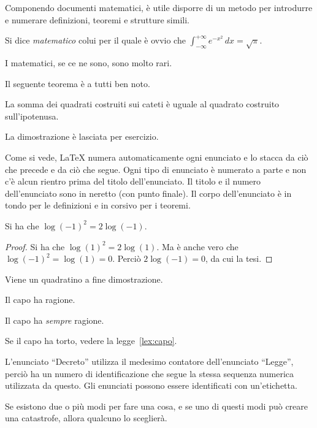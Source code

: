 Componendo documenti matematici, è utile disporre di un metodo per introdurre e numerare definizioni, teoremi e strutture simili.
\begin{definizione}[di Gauss] 
Si dice \emph{matematico} colui per il quale è ovvio che 
$\int_{-\infty}^{+\infty}
e^{-x^2}\,dx=\sqrt{\pi}$. 
\end{definizione} 
\begin{teorema} 
I matematici, se ce ne sono, sono molto rari.
\end{teorema} 

Il seguente teorema è a tutti ben noto.
\begin{teorema}[di Pitagora]
La somma dei quadrati costruiti sui cateti è uguale
al quadrato costruito
sull'ipotenusa.
\end{teorema}
La dimostrazione è lasciata per esercizio.

Come si vede, \LaTeX{} numera automaticamente ogni enunciato e lo stacca da ciò che precede e da ciò che segue. Ogni tipo di enunciato è numerato a parte e non c'è alcun rientro prima del titolo dell'enunciato. Il titolo e il numero dell'enunciato sono in neretto (con punto finale). Il corpo dell'enunciato è in tondo per le definizioni e in corsivo per i teoremi.
\begin{teorema}[Sorpresa]
Si ha che $\log(-1)^2=2\log(-1)$.
\end{teorema} 
\begin{proof} 
Si ha che $\log(1)^2 = 2\log(1)$.
Ma è anche vero che  $\log(-1)^2=\log(1)=0$.
Perciò $2\log(-1)=0$, da cui la tesi.
\end{proof}
Viene un quadratino a fine dimostrazione.
\begin{legge}
\label{lex:capo}
Il capo ha ragione.
\end{legge}
\begin{decreto}
Il capo ha \emph{sempre} ragione.
\end{decreto}
\begin{legge}
Se il capo ha torto, vedere la 
legge~\ref{lex:capo}.
\end{legge}
L'enunciato ``Decreto'' utilizza il medesimo contatore dell'enunciato ``Legge'', perciò ha un numero di identificazione che segue la stessa sequenza numerica utilizzata da questo. Gli enunciati possono essere identificati con un'etichetta.
\begin{murphy}
Se esistono due o più modi
per fare una cosa, e se uno
di questi modi può creare
una catastrofe, allora
qualcuno lo sceglierà.
\end{murphy}

